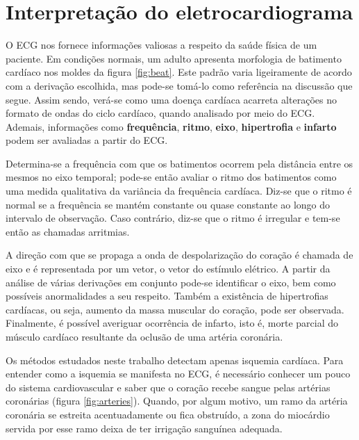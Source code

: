 \section{Interpretação do eletrocardiograma}
O ECG nos fornece informações valiosas a respeito da saúde física de um paciente. Em condições normais, um adulto apresenta morfologia de batimento cardíaco nos moldes da figura \ref{fig:beat}. Este padrão varia ligeiramente de acordo com a derivação escolhida, mas pode-se tomá-lo como referência na discussão que segue. Assim sendo, verá-se como uma doença cardíaca acarreta alterações no formato de ondas do ciclo cardíaco, quando analisado por meio do ECG. Ademais, informações como \textbf{frequência}, \textbf{ritmo}, \textbf{eixo}, \textbf{hipertrofia} e \textbf{infarto} podem ser avaliadas a partir do ECG. 

Determina-se a frequência com que os batimentos ocorrem pela distância entre os mesmos no eixo temporal; pode-se então avaliar o ritmo dos batimentos como uma medida qualitativa da variância da frequência cardíaca. Diz-se que o ritmo é normal se a frequência se mantém constante ou quase constante ao longo do intervalo de observação. Caso contrário, diz-se que o ritmo é irregular e tem-se então as chamadas arritmias.

A direção com que se propaga a onda de despolarização do coração é chamada de eixo e é representada por um vetor, o vetor do estímulo elétrico. A partir da análise de várias derivações em conjunto pode-se identificar o eixo, bem como possíveis anormalidades a seu respeito. Também a existência de hipertrofias cardíacas, ou seja, aumento da massa muscular do coração, pode ser observada. Finalmente, é possível averiguar ocorrência de infarto, isto é, morte parcial do músculo cardíaco resultante da oclusão de uma artéria coronária.

Os métodos estudados neste trabalho detectam apenas isquemia cardíaca. Para entender como a isquemia se manifesta no ECG, é necessário conhecer um pouco do sistema cardiovascular e saber que o coração recebe sangue pelas artérias coronárias (figura \ref{fig:arteries}). Quando, por algum motivo, um ramo da artéria coronária se estreita acentuadamente ou fica obstruído, a zona do miocárdio servida por esse ramo deixa de ter irrigação sanguínea adequada.

